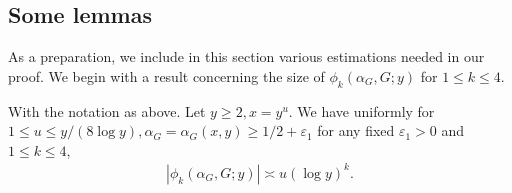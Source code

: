 \documentclass[twoside,leqno,10pt, A4]{amsart}
\begin{document}
\subsection{Some lemmas}    
  As a preparation, we include in this section various estimations needed in our proof. We begin with a result concerning the size of $\phi_k(\alpha_G,G;y)$ for $1 \leq k \leq 4$. 
\begin{lemma}
\label{lemphibound}
  With the notation as above. Let $y \geq 2, x=y^u$. We have uniformly for $1 \leq u \leq y/(8\log y), \alpha_G=\alpha_G(x,y) \geq 1/2+\varepsilon_1$ for any fixed $\varepsilon_1>0$ and $1 \leq k \leq 4$,
\begin{align}
\label{phikasymp}
  |\phi_k(\alpha_G,G;y)| \asymp u(\log y)^k. 
\end{align}
\end{lemma}  
\end{document}
